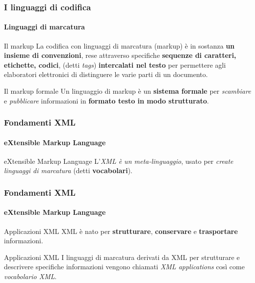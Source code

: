 \begin{frame}
	\frametitle{I linguaggi di codifica}
	\framesubtitle{Linguaggi di marcatura}
	\addtocounter{nframe}{1}

	\begin{block}{Il markup}
		La codifica con linguaggi di marcatura (markup) è in sostanza \textbf{un insieme di convenzioni}, rese attraverso specifiche \textbf{sequenze di caratteri, etichette, codici}, (detti \textit{tags}) \textbf{intercalati nel testo} per permettere agli elaboratori elettronici di distinguere le varie parti di un documento.
	\end{block}

	\begin{block}{Il markup formale}
		Un linguaggio di markup è un \textbf{sistema formale} per \textit{scambiare} e \textit{pubblicare} informazioni in \textbf{formato testo in modo strutturato}.
	\end{block}


\end{frame}




\begin{frame}
	\frametitle{Fondamenti XML}
	\framesubtitle{eXtensible Markup Language}
	\addtocounter{nframe}{1}

	
	\begin{block} {eXtensible Markup Language}
		L'\textit{XML è un meta-linguaggio}, usato per \textit{create linguaggi di marcatura} (detti \textbf{vocabolari}).
	\end{block}
\end{frame}

\begin{frame}
	\frametitle{Fondamenti XML}
	\framesubtitle{eXtensible Markup Language}
	\addtocounter{nframe}{1}

	\begin{block} {Applicazioni XML}
		XML è nato per \textbf{strutturare}, \textbf{conservare} e \textbf{trasportare} informazioni.
	\end{block}
	\begin{block} {Applicazioni XML}
		I linguaggi di marcatura derivati da XML per strutturare e descrivere specifiche informazioni vengono chiamati \textit{XML applications} così come \textit{vocabolario XML}.
	\end{block}
\end{frame}

